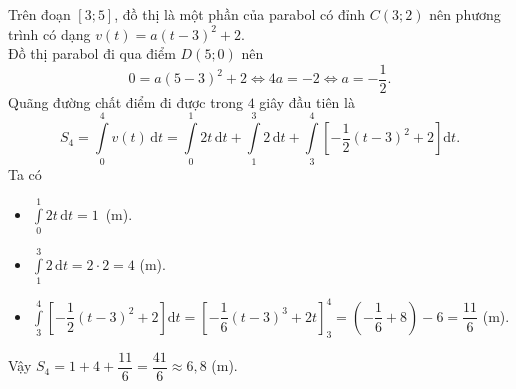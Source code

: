 \begin{ex}
{\begin{itemchoice}
			\itemch	Trên đoạn $[3;5]$, đồ thị là một phần của parabol có đỉnh $C(3;2)$ nên phương trình có dạng $v(t) = a(t-3)^2 + 2.$\\
			Đồ thị parabol đi qua điểm $D(5;0)$ nên $$0 = a(5-3)^2 + 2 \Leftrightarrow 4a = -2 \Leftrightarrow a = -\dfrac{1}{2}.$$
			\itemch Quãng đường chất điểm đi được trong $4$ giây đầu tiên là
			\[S_4 = \displaystyle\int\limits_0^4 v(t) \mathrm{\, d}t = \displaystyle\int\limits_0^1 2t \mathrm{\, d}t + \displaystyle\int\limits_1^3 2 \mathrm{\, d}t + \displaystyle\int\limits_3^4 \left[ -\dfrac{1}{2}(t-3)^2 + 2 \right] \mathrm{d}t.\]
			Ta có
			\begin{itemize}
				\item $\displaystyle\int\limits_0^1 2t \mathrm{\, d}t = 1$\, (m).
				\item $\displaystyle\int\limits_1^3 2 \mathrm{\, d}t = 2 \cdot 2 = 4$ (m).
				\item $\displaystyle\int\limits_3^4 \left[ -\dfrac{1}{2}(t-3)^2 + 2 \right] \mathrm{d}t = \left[ -\dfrac{1}{6}(t-3)^3 + 2t \right]_{3}^{4} = \left(-\dfrac{1}{6} + 8\right) - 6 = \dfrac{11}{6}$ (m).
			\end{itemize}			
			Vậy $S_4 = 1 + 4 + \dfrac{11}{6} = \dfrac{41}{6} \approx 6{,}8$ (m). 
		\end{itemchoice}
	}
\end{ex}

